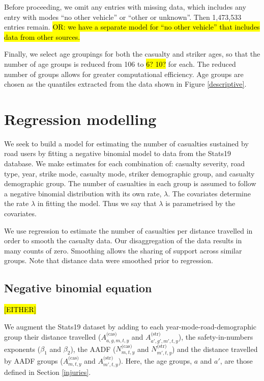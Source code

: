 \documentclass{article}
\begin{document}
Before proceeding, we omit any entries with missing data, which includes any entry with modes ``no other vehicle'' or ``other or unknown''. Then 1,473,533 entries remain. \hl{OR: we have a separate model for ``no other vehicle'' that includes data from other sources.}

Finally, we select age groupings for both the casualty and striker ages, so that the number of age groups is reduced from 106 to \hl{6? 10?} for each. The reduced number of groups allows for greater computational efficiency. Age groups are chosen as the quantiles extracted from the data shown in Figure \ref{descriptive}.


\section{Regression modelling}\label{regression}

We seek to build a model for estimating the number of casualties sustained by road users by fitting a negative binomial model to data from the Stats19 database. We make estimates for each combination of: casualty severity, road type, year, strike mode, casualty mode, striker demographic group, and casualty demographic group. The number of casualties in each group is assumed to follow a negative binomial distribution with its own rate, $\lambda$. The covariates determine the rate $\lambda$ in fitting the model. Thus we say that $\lambda$ is parametrised by the covariates.

We use regression to estimate the number of casualties per distance travelled in order to smooth the casualty data. Our disaggregation of the data results in many counts of zero. Smoothing allows the sharing of support across similar groups. Note that distance data were smoothed prior to regression.

\subsection{Negative binomial equation}

\hl{[EITHER]}

We augment the Stats19 dataset by adding to each year-mode-road-demographic group their distance travelled ($A_{a,g,m,t,y}^{\text{(cas)}}$ and $A_{a',g',m',t,y}^{\text{(str)}}$), the safety-in-numbers exponents ($\beta_1$ and $\beta_2$), the AADF ($N_{m,t,y}^{\text{(cas)}}$ and $N_{m',t,y}^{\text{(str)}}$) and the distance travelled by AADF groups ($A_{m,t,y}^{\text{(cas)}}$ and $A_{m',t,y}^{\text{(str)}}$). Here, the age groups, $a$ and $a'$, are those defined in Section \ref{injuries}.
\end{document}
